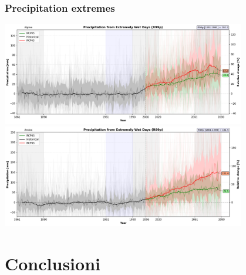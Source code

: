 \documentclass[14pt,usenames,dvipsnames]{beamer}
\begin{document}

\begin{frame}
\frametitle{Precipitation extremes}
\begin{center}

{\includegraphics[width=0.8\textwidth]{risultati/r99p_Alpine_Models_ts}}
{\includegraphics[width=0.8\textwidth]{risultati/r99p_Andes_Models_ts}}
\end{center}
\end{frame}

%


\section{Conclusioni}
\end{document}
